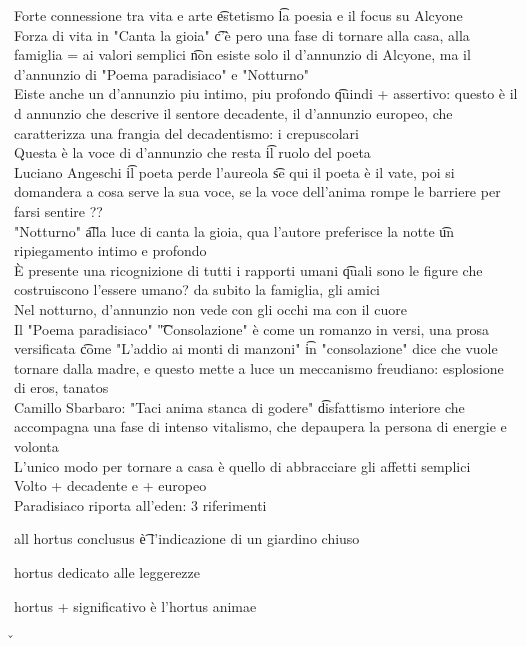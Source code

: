 \documentclass[12pt]{article}
\begin{document}
\s[D'annunzio]
Forte connessione tra vita e arte \t estetismo \t la poesia e il focus su Alcyone \\
Forza di vita in "Canta la gioia" \t c'è pero una fase di tornare alla casa, alla famiglia = ai valori semplici \t non esiste solo il d'annunzio di Alcyone, ma il d'annunzio di "Poema paradisiaco" e "Notturno" \\
Eiste anche un d'annunzio piu intimo, piu profondo \t quindi + assertivo: questo è il d annunzio che descrive il sentore decadente, il d'annunzio europeo, che caratterizza una frangia del decadentismo: i crepuscolari \\
Questa è la voce di d'annunzio che resta \t il ruolo del poeta \\
Luciano Angeschi \t il poeta perde l'aureola \t se qui il poeta è il vate, poi si domandera a cosa serve la sua voce, se la voce dell'anima rompe le barriere per farsi sentire ?? \\
"Notturno" \t alla luce di canta la gioia, qua l'autore preferisce la notte \t un ripiegamento intimo e profondo \\
È presente una ricognizione di tutti i rapporti umani \t quali sono le figure che costruiscono l'essere umano? da subito la famiglia, gli amici \\
Nel notturno, d'annunzio non vede con gli occhi ma con il cuore \\
Il "Poema paradisiaco" \t "Consolazione" è come un romanzo in versi, una prosa versificata \t come "L'addio ai monti di manzoni" \t in "consolazione" dice che vuole tornare dalla madre, e questo mette a luce un meccanismo freudiano: esplosione di eros, tanatos \\
Camillo Sbarbaro: "Taci anima stanca di godere" \t disfattismo interiore che accompagna una fase di intenso vitalismo, che depaupera la persona di energie e volonta \\ 
L'unico modo per tornare a casa è quello di abbracciare gli affetti semplici \\
Volto + decadente e + europeo \\
Paradisiaco riporta all'eden: 3 riferimenti
\bi
    \item all hortus conclusus \t è l'indicazione di un giardino chiuso
    \item hortus dedicato alle leggerezze
    \item hortus + significativo è l'hortus animae
\ei

\v 
\end{document}
